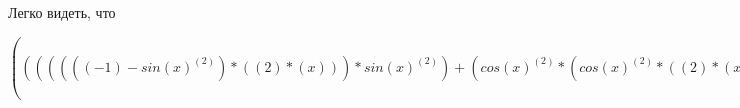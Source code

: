 \documentclass[12pt,a4paper,fleqn]{article}
\theoremstyle{definition}
\begin{document}
Легко видеть, что

$((((((( -1 ) - sin{( x )}^{( 2 )}) * (( 2 ) * ( x ))) * sin{( x )}^{( 2 )}) + (cos{( x )}^{( 2 )} * (cos{( x )}^{( 2 )} * (( 2 ) * ( x ))))) * \log_{( x )}{(( 3.5 ) * ( x ))}) + ((cos{( x )}^{( 2 )} * sin{( x )}^{( 2 )}) * \frac{(\frac{(\log_{( 2.71828 )}{( x )} * ( 3.5 ))}{(( 3.5 ) * ( x ))}
 - \frac{\log_{( 2.71828 )}{(( 3.5 ) * ( x ))}}{( x )}
)}{(\log_{( 2.71828 )}{( x )} * \log_{( 2.71828 )}{( x )})}
)) = ((((((( -1 ) - sin{( x )}^{( 2 )}) * (( 2 ) * ( x ))) * sin{( x )}^{( 2 )}) + (cos{( x )}^{( 2 )} * (cos{( x )}^{( 2 )} * (( 2 ) * ( x ))))) * \log_{( x )}{(( 3.5 ) * ( x ))}) + ((cos{( x )}^{( 2 )} * sin{( x )}^{( 2 )}) * \frac{(\frac{(\log_{( 2.71828 )}{( x )} * ( 3.5 ))}{(( 3.5 ) * ( x ))}
 - \frac{\log_{( 2.71828 )}{(( 3.5 ) * ( x ))}}{( x )}
)}{(\log_{( 2.71828 )}{( x )} * \log_{( 2.71828 )}{( x )})}
))$
\end{document}
